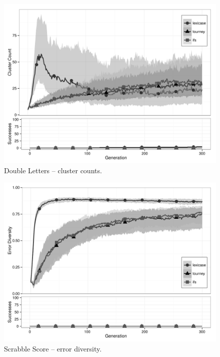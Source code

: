 \begin{figure}[p] %
\centering
\includegraphics[width=11.5cm]{double-letters-cluster.pdf}
\caption{Double Letters -- cluster counts.}
\label{double-lettersClu}
\end{figure}

\begin{figure}[p] %
\centering
\includegraphics[width=11.5cm]{scrabble-score-diversity.pdf}
\caption{Scrabble Score -- error diversity.}
\label{scrabble-scoreDiv}
\end{figure}

